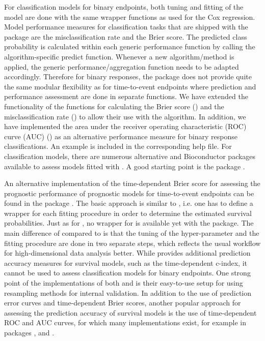 \documentclass[nojss]{jss}
\begin{document}
For classification models for binary endpoints, both tuning and fitting of the model are done with the same wrapper functions as used for the Cox regression. Model performance measures for classification tasks that are shipped with the  package are the misclassification rate and the Brier score. The predicted class probability is calculated within each generic performance function by calling the algorithm-specific predict function. Whenever a new algorithm/method is applied, the generic performance/aggregation function needs to be adapted accordingly. Therefore for binary responses, the  package does not provide quite the same modular flexibility as for time-to-event endpoints where prediction and performance assessment are done in separate functions.
We have extended the functionality of the  functions for calculating the Brier score () and the misclassification rate () to allow their use with the  algorithm. In addition, we have implemented the area under the receiver operating characteristic (ROC) curve (AUC) () as an alternative performance measure for binary response classifications. An example is included in the corresponding help file. For classification models, there are numerous alternative  and Bioconductor packages available to assess models fitted with . A good starting point is the package  \citep{caret}.

An alternative implementation of the time-dependent Brier score for assessing the prognostic performance of prognostic models for time-to-event endpoints can be found in the package  \citep{MIG2012}. The basic approach is similar to , i.e. one has to define a wrapper for each fitting procedure in order to determine the estimated survival probabilities. Just as for , no wrapper for  is available yet with the  package. The main difference of  compared to  is that the tuning of the hyper-parameter and the fitting procedure are done in two separate steps, which reflects the usual workflow for high-dimensional data analysis better. While  provides additional prediction accuracy measures for survival models, such as the time-dependent c-index, it cannot be used to assess classification models for binary endpoints. One strong point of the implementations of both  and  is their easy-to-use setup for using resampling methods for internal validation. In addition to the use of prediction error curves and time-dependent Brier scores, another popular approach for assessing the prediction accuracy of survival models is the use of time-dependent ROC and AUC curves, for which many implementations exist, for example in  packages  \citep{timeROC},  \citep{survivalROC} and  \citep{risksetROC}. 
\end{document}
